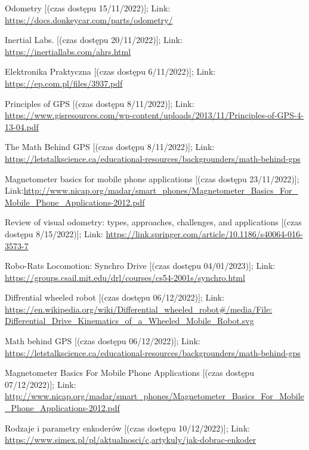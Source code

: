 \begin{thebibliography}{9}
    Odometry [(czas dostępu  15/11/2022)]; Link: 
    \url{https://docs.donkeycar.com/parts/odometry/}

    Inertial Labs. [(czas dostępu  20/11/2022)]; Link: \url{https://inertiallabs.com/ahrs.html}

    Elektronika Praktyczna [(czas dostępu  6/11/2022)]; Link: \url{https://ep.com.pl/files/3937.pdf}

    Principles of GPS [(czas dostępu  8/11/2022)]; Link: \url{https://www.gisresources.com/wp-content/uploads/2013/11/Principles-of-GPS-4-13-04.pdf}

    The Math Behind GPS [(czas dostępu  8/11/2022)]; Link: \url{https://letstalkscience.ca/educational-resources/backgrounders/math-behind-gps}

    Magnetometer basics for mobile phone applications [(czas dostępu  23/11/2022)]; Link:\url{http://www.nicap.org/madar/smart_phones/Magnetometer_Basics_For_Mobile_Phone_Applications-2012.pdf}

    Review of visual odometry: types, approaches, challenges, and applications [(czas dostępu  8/15/2022)]; Link: \url{https://link.springer.com/article/10.1186/s40064-016-3573-7}

    Robo-Rats Locomotion: Synchro Drive [(czas dostępu  04/01/2023)]; 
    Link: \url{https://groups.csail.mit.edu/drl/courses/cs54-2001s/synchro.html}

    Diffrential wheeled robot [(czas dostępu  06/12/2022)]; 
    Link: \url{https://en.wikipedia.org/wiki/Differential_wheeled_robot#/media/File:
    Differential_Drive_Kinematics_of_a_Wheeled_Mobile_Robot.svg}
    
    Math behind GPS [(czas dostępu  06/12/2022)]; 
    Link: \url{https://letstalkscience.ca/educational-resources/backgrounders/math-behind-gps}
    
    Magnetometer Basics For Mobile Phone Applications [(czas dostępu  07/12/2022)]; 
    Link: \url{http://www.nicap.org/madar/smart_phones/Magnetometer_Basics_For_Mobile_Phone_Applications-2012.pdf}
    
    Rodzaje i parametry enkoderów [(czas dostępu  10/12/2022)]; 
    Link: \url{https://www.simex.pl/pl/aktualnosci/c,artykuly/jak-dobrac-enkoder}
    

\end{thebibliography}
